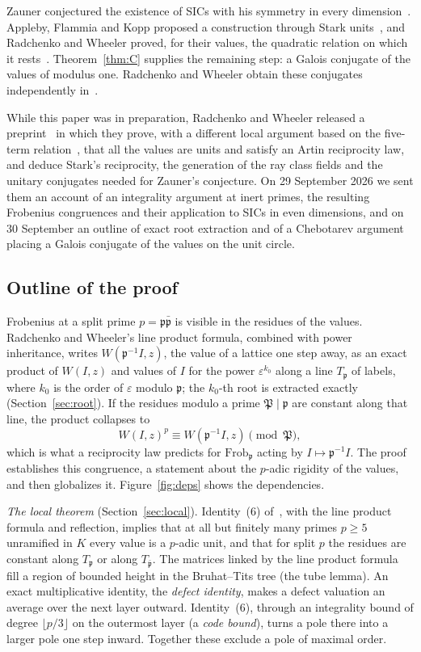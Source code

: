 \documentclass[11pt]{amsart}
\numberwithin{equation}{section}
\theoremstyle{plain}
\theoremstyle{definition}
\theoremstyle{remark}
\newcommand{\Frob}{\mathrm{Frob}}
\begin{document}
Zauner conjectured the existence of SICs with his symmetry in every dimension~\cite{Za}. Appleby, Flammia and Kopp proposed a construction through Stark units~\cite{AFK}, and Radchenko and Wheeler proved, for their values, the quadratic relation on which it rests~\cite[\S4.4, Thm.~7]{RW}. Theorem~\ref{thm:C} supplies the remaining step: a Galois conjugate of the values of modulus one. Radchenko and Wheeler obtain these conjugates independently in~\cite{RW2}.

While this paper was in preparation, Radchenko and Wheeler released a preprint~\cite{RW2} in which they prove, with a different local argument based on the five-term relation~\cite[(7)]{RW}, that all the values are units and satisfy an Artin reciprocity law, and deduce Stark's reciprocity, the generation of the ray class fields and the unitary conjugates needed for Zauner's conjecture. On 29 September 2026 we sent them an account of an integrality argument at inert primes, the resulting Frobenius congruences and their application to SICs in even dimensions, and on 30 September an outline of exact root extraction and of a Chebotarev argument placing a Galois conjugate of the values on the unit circle.

\subsection{Outline of the proof}\label{sec:arch}

Frobenius at a split prime $p=\mathfrak p\bar{\mathfrak p}$ is visible in the residues of the values. Radchenko and Wheeler's line product formula, combined with power inheritance, writes $W(\mathfrak p^{-1}I,z)$, the value of a lattice one step away, as an exact product of $W(I,z)$ and values of $I$ for the power $\varepsilon^{k_0}$ along a line $T_{\mathfrak p}$ of labels, where $k_0$ is the order of $\varepsilon$ modulo $\mathfrak p$; the $k_0$-th root is extracted exactly (Section~\ref{sec:root}). If the residues modulo a prime $\mathfrak P\mid\mathfrak p$ are constant along that line, the product collapses to
\[
W(I,z)^p\equiv W(\mathfrak p^{-1}I,z)\pmod{\mathfrak P},
\]
which is what a reciprocity law predicts for $\Frob_{\mathfrak p}$ acting by $I\mapsto\mathfrak p^{-1}I$. The proof establishes this congruence, a statement about the $p$-adic rigidity of the values, and then globalizes it. Figure~\ref{fig:deps} shows the dependencies.

\emph{The local theorem} (Section~\ref{sec:local}). Identity~(6) of~\cite{RW}, with the line product formula and reflection, implies that at all but finitely many primes $p\ge5$ unramified in $K$ every value is a $p$-adic unit, and that for split $p$ the residues are constant along $T_{\mathfrak p}$ or along $T_{\bar{\mathfrak p}}$. The matrices linked by the line product formula fill a region of bounded height in the Bruhat--Tits tree (the tube lemma). An exact multiplicative identity, the \emph{defect identity}, makes a defect valuation an average over the next layer outward. Identity~(6), through an integrality bound of degree $\lfloor p/3\rfloor$ on the outermost layer (a \emph{code bound}), turns a pole there into a larger pole one step inward. Together these exclude a pole of maximal order.
\end{document}
